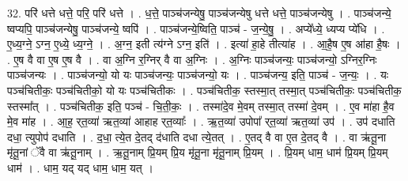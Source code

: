 \documentclass[17pt]{extarticle}
\begin{document}
32. परि॑ धत्ते धत्ते॒ परि॒ परि॑ धत्ते । . ध॒त्ते॒ पाञ्च॑जन्येषु॒ पाञ्च॑जन्येषु धत्ते धत्ते॒ पाञ्च॑जन्येषु । . पाञ्च॑जन्ये॒ ष्वप्यपि॒ पाञ्च॑जन्येषु॒ पाञ्च॑जन्ये॒ ष्वपि॑ । . पाञ्च॑जन्ये॒ष्विति॒ पाञ्च॑ - ज॒न्ये॒षु॒ । . अप्ये᳚ध्ये॒ ध्यप्य प्ये॑धि । . ए॒ध्य॒ग्ने॒ ऽग्न॒ ए॒ध्ये॒ ध्य॒ग्ने॒ । . अ॒ग्न॒ इती त्य॑ग्ने ऽग्न॒ इति॑ । . इत्या॑ हा॒हे तीत्या॑ह । . आ॒है॒ष ए॒ष आ॑हा है॒षः । . ए॒ष वै वा ए॒ष ए॒ष वै । . वा अ॒ग्नि र॒ग्निर् वै वा अ॒ग्निः । . अ॒ग्निः पाञ्च॑जन्यः॒ पाञ्च॑जन्यो॒ ऽग्निर॒ग्निः पाञ्च॑जन्यः । . पाञ्च॑जन्यो॒ यो यः पाञ्च॑जन्यः॒ पाञ्च॑जन्यो॒ यः । . पाञ्च॑जन्य॒ इति॒ पाञ्च॑ - ज॒न्यः॒ । . यः पञ्च॑चितीकः॒ पञ्च॑चितीको॒ यो यः पञ्च॑चितीकः । . पञ्च॑चितीक॒ स्तस्मा॒त् तस्मा॒त् पञ्च॑चितीकः॒ पञ्च॑चितीक॒ स्तस्मा᳚त् । . पञ्च॑चितीक॒ इति॒ पञ्च॑ - चि॒ती॒कः॒ । . तस्मा॑दे॒व मे॒वम् तस्मा॒त् तस्मा॑ दे॒वम् । . ए॒व मा॑हा है॒व मे॒व मा॑ह । . आ॒ह॒ र्‌त॒व्या॑ ऋत॒व्या॑ आहाह र्‌त॒व्याः᳚ । . ऋ॒त॒व्या॑ उपोपा᳚ र्‌त॒व्या॑ ऋत॒व्या॑ उप॑ । . उप॑ दधाति दधा॒ त्युपोप॑ दधाति । . द॒धा॒ त्ये॒त दे॒तद् द॑धाति दधा त्ये॒तत् । . ए॒तद् वै वा ए॒त दे॒तद् वै । . वा ऋ॑तू॒ना मृ॑तू॒नां ॅवै वा ऋ॑तू॒नाम् । . ऋ॒तू॒नाम् प्रि॒यम् प्रि॒य मृ॑तू॒ना मृ॑तू॒नाम् प्रि॒यम् । . प्रि॒यम् धाम॒ धाम॑ प्रि॒यम् प्रि॒यम् धाम॑ । . धाम॒ यद् यद् धाम॒ धाम॒ यत् । \newline
\end{document}
